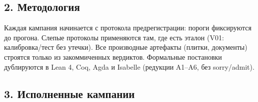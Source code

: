 \documentclass[11pt,a4paper]{article}
\begin{document}
\subsection{2. Методология}

Каждая кампания начинается с протокола предрегистрации: пороги фиксируются до прогона. Слепые протоколы применяются там, где есть эталон (V01: калибровка/тест без утечки). Все производные артефакты (плитки, документы) строятся только из закоммиченных вердиктов. Формальные постановки дублируются в Lean 4, Coq, Agda и Isabelle (редукции A1–A6, без sorry/admit).

\subsection{3. Исполненные кампании}
\end{document}
